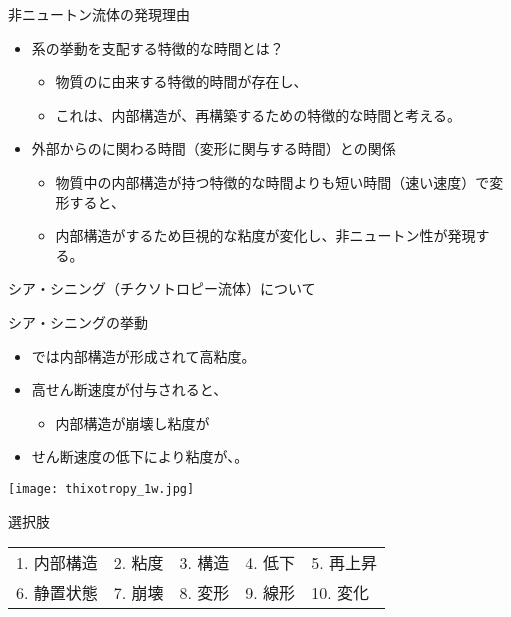 \documentclass[uplatex,dvipdfmx,a4paper,11pt]{jsarticle}
\begin{document}
\begin{qlist}
\begin{qlist2}
			\vspace{3mm}
			\qitem 非ニュートン流体の発現理由
			\begin{itemize}
				\item 系の挙動を支配する特徴的な時間とは？
				\begin{itemize}
					\item 物質の\qbox{}に由来する特徴的時間が存在し、
					\item これは、内部構造が\qbox{}、再構築するための特徴的な時間と考える。
				\end{itemize}
				\item 外部からの\qbox{}に関わる時間（変形に関与する時間）との関係
				\begin{itemize}
					\item 物質中の内部構造が持つ特徴的な時間よりも短い時間（速い速度）で変形すると、
					\item 内部構造が\qbox{}するため巨視的な粘度が変化し、非ニュートン性が発現する。
				\end{itemize}
			\end{itemize}
			
			\vspace{3mm}
			\qitem シア・シニング（チクソトロピー流体）について
			\begin{center}
				\begin{minipage}{0.5\textwidth}
					\begin{itembox}[l]{シア・シニングの挙動}
						\begin{itemize}
							\item \qbox{}では内部構造が形成されて高粘度。
							\item 高せん断速度が付与されると、
							\begin{itemize}
								\item 内部構造が崩壊し粘度が\qbox{}
							\end{itemize}
							\item せん断速度の低下により粘度が、\qbox{}。
						\end{itemize}
					\end{itembox}
				\end{minipage}
				\begin{minipage}{0.38\textwidth}
					\begin{center}
					\texttt{[image: thixotropy\_1w.jpg]}
					\end{center}
				\end{minipage}
			\end{center}

		\end{qlist2}

		\begin{itembox}[l]{選択肢}
			\begin{center}
				\begin{tabular}{lllll}
					1. 内部構造	&2. 粘度	&3. 構造	&4. 低下 &5. 再上昇\\
					6. 静置状態	&7. 崩壊	&8. 変形	&9. 線形 &10. 変化
				\end{tabular}
			\end{center}
		\end{itembox}
\end{qlist}
\end{document}
